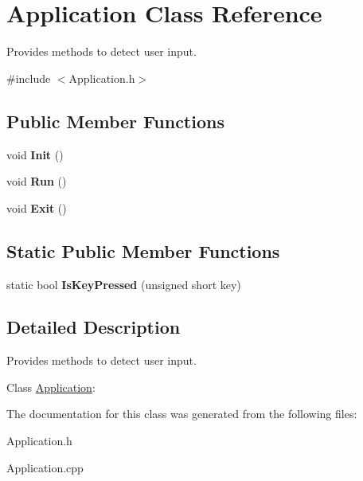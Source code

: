 \hypertarget{class_application}{\section{Application Class Reference}
\label{class_application}
}


Provides methods to detect user input.  




{\ttfamily \#include $<$Application.\+h$>$}

\subsection*{Public Member Functions}
\begin{DoxyCompactItemize}
\item 
\hypertarget{class_application_a276388f7090c0a2b1c8b16cf033b969d}{void {\bfseries Init} ()}\label{class_application_a276388f7090c0a2b1c8b16cf033b969d}

\item 
\hypertarget{class_application_aaf09cd6cb412086dc039e28cdb059f0d}{void {\bfseries Run} ()}\label{class_application_aaf09cd6cb412086dc039e28cdb059f0d}

\item 
\hypertarget{class_application_a9d410604b39b8374a884b1f2a1f2a5ba}{void {\bfseries Exit} ()}\label{class_application_a9d410604b39b8374a884b1f2a1f2a5ba}

\end{DoxyCompactItemize}
\subsection*{Static Public Member Functions}
\begin{DoxyCompactItemize}
\item 
\hypertarget{class_application_a72cc9bba26506a7c0f54c346dfbd5cfe}{static bool {\bfseries Is\+Key\+Pressed} (unsigned short key)}\label{class_application_a72cc9bba26506a7c0f54c346dfbd5cfe}

\end{DoxyCompactItemize}


\subsection{Detailed Description}
Provides methods to detect user input. 

Class \hyperlink{class_application}{Application}\+: 

The documentation for this class was generated from the following files\+:\begin{DoxyCompactItemize}
\item 
Application.\+h\item 
Application.\+cpp\end{DoxyCompactItemize}
